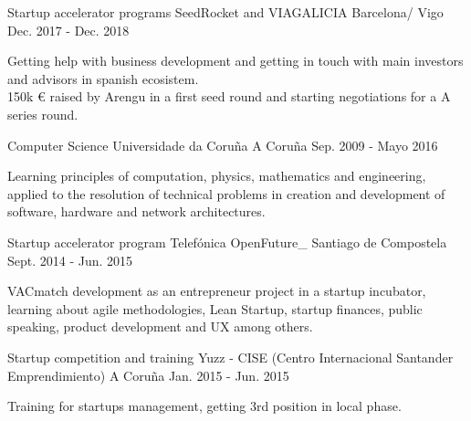 


\begin{cventries}


\cventry
{Startup accelerator programs} %
{SeedRocket and VIAGALICIA} %
{Barcelona/ Vigo} %
{Dec. 2017 - Dec. 2018} %
{ %
\begin{cvitems}
Getting help with business development and getting in touch with main investors and advisors in spanish ecosistem.\\
150k € raised by Arengu in a first seed round and starting negotiations for a A series round.
\end{cvitems}
}


\cventry
{Computer Science} %
{Universidade da Coruña} %
{A Coruña} %
{Sep. 2009 - Mayo 2016} %
{ %
\begin{cvitems}
Learning principles of computation, physics, mathematics and engineering, applied to the resolution of technical problems in creation and development of software, hardware and network architectures.
\end{cvitems}
}


\cventry
{Startup accelerator program } %
{Telefónica OpenFuture\_} %
{Santiago de Compostela} %
{Sept. 2014 - Jun. 2015} %
{ %
\begin{cvitems}
VACmatch development as an entrepreneur project in a startup incubator, 
learning about agile methodologies, Lean Startup, startup finances, public 
speaking, product development and UX among others.
\end{cvitems}
}


\cventry
{Startup competition and training} %
{Yuzz - CISE (Centro Internacional Santander Emprendimiento)} %
{A Coruña} %
{Jan. 2015 - Jun. 2015} %
{ %
\begin{cvitems}
Training for startups management, getting 3rd position in 
local phase.
\end{cvitems}
}


\end{cventries}
